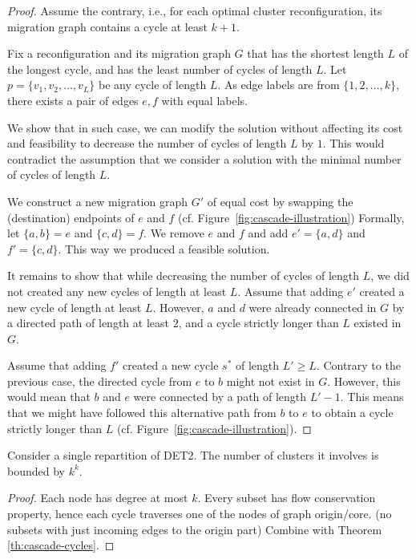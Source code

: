 \documentclass[manuscript,screen=true, review, anonymous]{acmart}
\begin{document}
\begin{proof}
	Assume the contrary, i.e., for each optimal cluster reconfiguration, its migration graph contains a cycle at least $k+1$.
	
	Fix a reconfiguration and its migration graph $G$ that has the shortest length $L$ of the longest cycle, and has the least number of cycles of length $L$.
	Let $p = \lbrace v_1, v_2, \ldots, v_L \rbrace$ be any cycle of length $L$.
	As edge labels are from $\{ 1, 2, \ldots, k \}$, there exists a pair of edges $e, f$ with equal labels.
	
	We show that in such case, we can modify the solution without affecting its cost and feasibility to decrease the number of cycles of length $L$ by $1$.
	This would contradict the assumption that we consider a solution with the minimal number of cycles of length $L$.
	
	We construct a new migration graph $G'$ of equal cost by swapping the (destination) endpoints of $e$ and $f$ (cf. Figure~\ref{fig:cascade-illustration})
	Formally, let $\lbrace a, b \rbrace = e$ and $\lbrace c, d \rbrace = f$.
	We remove $e$ and $f$ and add $e' = \lbrace a, d \rbrace$ and $f' = \lbrace c, d \rbrace$.
	This way we produced a feasible solution.
	
	It remains to show that while decreasing the number of cycles of length $L$, we did not created any new cycles of length at least $L$.
	Assume that adding $e'$ created a new cycle of length at least $L$.
	However, $a$ and $d$ were already connected in $G$ by a directed path of length at least $2$, and a cycle strictly longer than $L$ existed in $G$.
	
	Assume that adding $f'$ created a new cycle $s^*$ of length $L' \geq L$.
	Contrary to the previous case, the directed cycle from $e$ to $b$ might not exist in $G$.
	However, this would mean that $b$ and $e$ were connected by a path of length $L'-1$.
	This means that we might have followed this alternative path from $b$ to $e$ to obtain a cycle strictly longer than $L$ (cf. Figure~\ref{fig:cascade-illustration}).
	
\end{proof}


\begin{theorem}
	Consider a single repartition of DET2.
	The number of clusters it involves is bounded by $k^k$.
	\label{th:cascade}
\end{theorem}

\begin{proof}
	Each node has degree at most $k$.
	Every subset has flow conservation property, hence each cycle traverses one of the nodes of graph origin/core. (no subsets with just incoming edges to the origin part)
	Combine with Theorem \ref{th:cascade-cycles}.
	
\end{proof}
\end{document}

